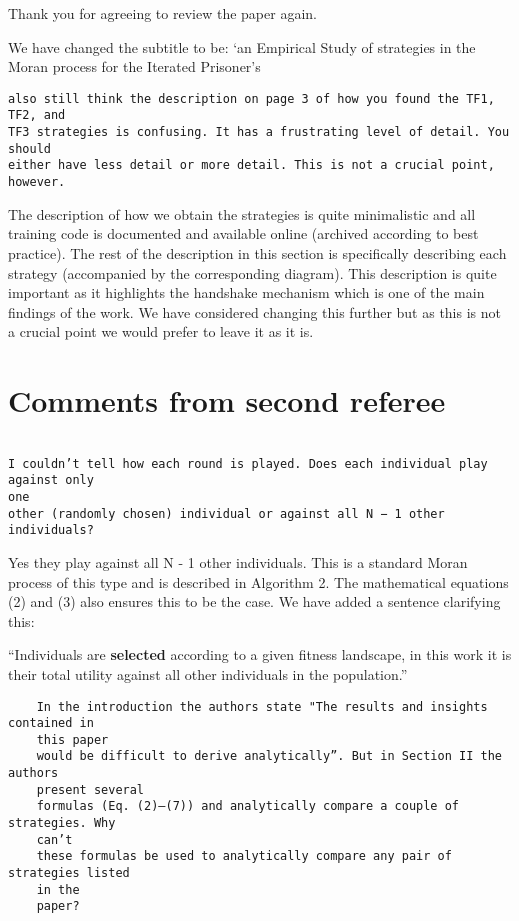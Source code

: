 \documentclass[a4]{article}
\begin{document}
Thank you for agreeing to review the paper again.

We have changed the subtitle to be: `an Empirical Study of strategies in the Moran
process for the Iterated Prisoner's

\begin{verbatim}
also still think the description on page 3 of how you found the TF1, TF2, and
TF3 strategies is confusing. It has a frustrating level of detail. You should
either have less detail or more detail. This is not a crucial point, however.
\end{verbatim}

The description of how we obtain the strategies is quite minimalistic and all
training code is documented and available online (archived according to best
practice).
The rest of the description in this section is specifically describing each
strategy (accompanied by the corresponding diagram). This description is quite
important as it highlights the handshake mechanism which is one of the main
findings of the work. We have considered changing this further but as this is
not a crucial point we would prefer to leave it as it is.

\section{Comments from second referee}

\begin{verbatim}

I couldn’t tell how each round is played. Does each individual play against only
one
other (randomly chosen) individual or against all N − 1 other individuals?

\end{verbatim}

Yes they play against all N - 1 other individuals. This is a standard Moran
process of this type and is described in
Algorithm 2. The mathematical equations (2) and (3) also ensures this to be the
case. We have added a sentence clarifying this:

``Individuals are \textbf{selected}
according to a given fitness landscape, in this work it is their total utility
against all other individuals in the population.''

\begin{verbatim}
    In the introduction the authors state "The results and insights contained in
    this paper
    would be difficult to derive analytically”. But in Section II the authors
    present several
    formulas (Eq. (2)–(7)) and analytically compare a couple of strategies. Why
    can’t
    these formulas be used to analytically compare any pair of strategies listed
    in the
    paper?
\end{verbatim}
\end{document}
